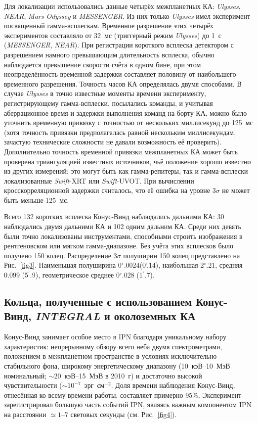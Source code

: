 Для локализации использовались данные четырёх межпланетных КА: \textit{Ulysses}, 
\textit{NEAR}, \textit{Mars Odyssey} и \textit{MESSENGER}. Из них только \textit{Ulysses} 
имел эксперимент посвященный гамма-всплескам. Временное разрешение этих четырёх 
экспериментов составляло от 32~мс (триггерный режим \textit{Ulysses}) 
до 1~с (\textit{MESSENGER}, \textit{NEAR}). При регистрации короткого всплеска 
детектором с разрешением намного превышающим длительность всплеска, обычно 
наблюдается превышение скорости счёта в одном бине, при этом неопределённость 
временной задержки составляет половину от наибольшего временного разрешения. 
Точность часов КА определялась двумя способами. В случае \textit{Ulysses} в точно 
известные моменты времени эксперименту, регистрирующему гамма-всплески, посылались 
команды, и учитывая аберрационное время и задержки выполнения команд на борту КА, 
можно было уточнить временную привязку с точностью от нескольких миллисекунд 
до 125~мс (хотя точность привязки предполагалась равной нескольким миллисекундам, 
зачастую технические сложности не давали возможность её проверить). 
Дополнительно точность временной привязки межпланетных КА может быть проверена 
триангуляцией известных источников, чьё положение хорошо известно из других измерений: 
это могут быть как гамма-репитеры, так и гамма-всплески локализованные \textit{Swift}-XRT 
или \textit{Swift}-UVOT. При вычислении кросскорреляционной задержки считалось, 
что её ошибка на уровне 3$\sigma$ не может быть меньше 125~мс.

Всего 132 коротких всплеска Конус-Винд наблюдались дальними КА: 30 наблюдались 
двумя дальними КА и 102 одним дальним КА. Среди них девять были точно локализованы 
инструментами, способными строить изображения в рентгеновском или мягком гамма-диапазоне. 
Без учёта этих всплесков было получено 150 колец. Распределение $3\sigma$ полуширин 150 колец 
представлено на Рис.~\ref{fig3}. Наименьшая полуширина 0$^{\circ}$.0024(0'.14), 
наибольшая 2$^{\circ}$.21, средняя 0.099 (5$^\prime$.9), геометрическое 
среднее 0$^{\circ}$.028 (1$^\prime$.7).

\subsection{Кольца, полученные с использованием Конус-Винд, \textit{INTEGRAL} и околоземных КА}
Конус-Винд занимает особое место в IPN благодаря уникальному набору характеристик: 
непрерывному обзору всего неба двумя спектрометрами, положением в межпланетном 
пространстве в условиях исключительно стабильного фона, широкому энергетическому 
диапазону (10~кэВ--10~МэВ номинальный; $\sim 20$~кэВ--15~МэВ в 2010~г) и достаточно 
высокой чувствительности ($\sim 10^{-7}$~эрг~см$^{-2}$. Доля времени наблюдения 
Конус-Винд, отнесённая ко всему времени работы, составляет примерно 95\%. 
Эксперимент зарегистрировал большую часть событий IPN, являясь важным компонентом 
IPN на расстоянии $\simeq 1\textrm{--}7$ световых секунды (см. Рис.~\ref{fig4}).

